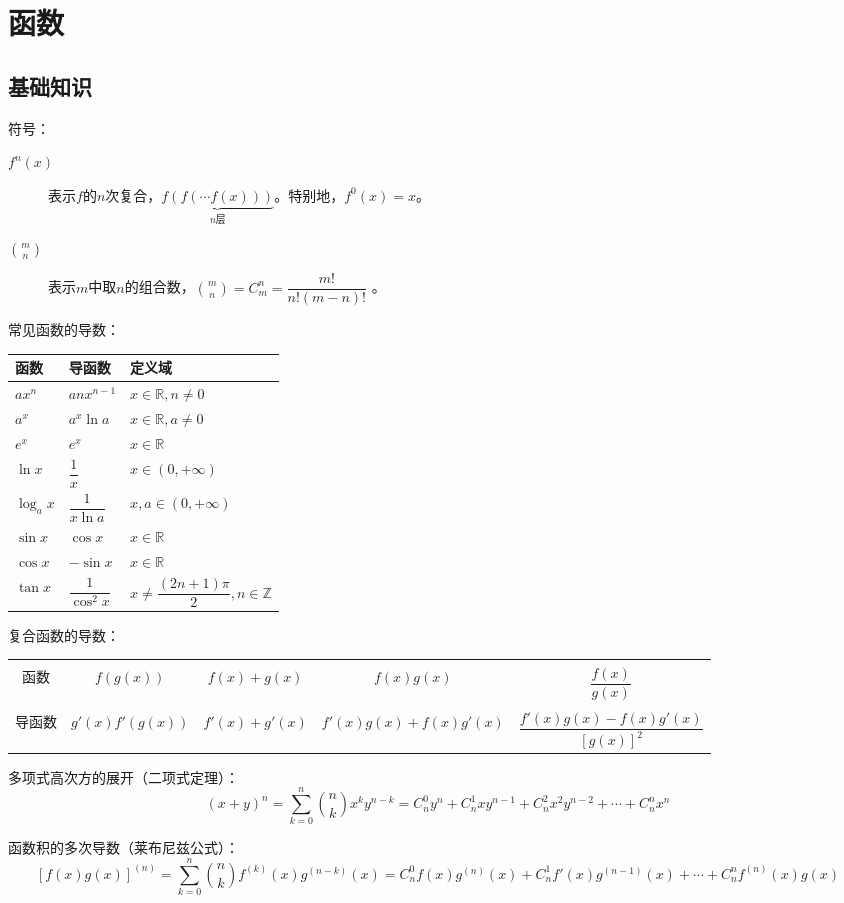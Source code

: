 \setchapterpreamble[u]{\margintoc}
\chapter{函数}
\section{基础知识}
符号：
\begin{description}
	\item[$f^n(x)$] 表示$f$的$n$次复合，$\underbrace{f(f(\cdots f(x)))}_{n\text{层}}$。特别地，$f^0(x)=x$。 
	\item[$\displaystyle\binom{m}{n}$] 表示$m$中取$n$的组合数，$\displaystyle\binom{m}{n}=C_m^n=\dfrac{m!}{n!(m-n)!}$ 。
\end{description}
常见函数的导数：\\
\begin{center}
	\begin{tabular}{lll}
		\hline
		函数&导函数&定义域\\
		\hline
		$ax^n$&$anx^{n-1}$&$x\in\mathbb{R},n\neq 0$\\
		$a^x$&$a^x\ln a$&$x \in \mathbb{R},a\neq 0$\\
		$e^x$&$e^x$&$x \in \mathbb{R}$\\
		$\ln x$&$\dfrac{1}{x}$&$x \in (0,+\infty)$\\
		$\log_a{x}$&$\dfrac{1}{x\ln a}$&$x,a \in (0,+\infty)$\\
		$\sin x$&$\cos x$&$x\in \mathbb{R}$\\
		$\cos x$&$-\sin x$&$x\in \mathbb{R}$\\
		$\tan x$&$\dfrac{1}{\cos^2 x}$&$x \neq \dfrac{(2n+1)\pi}{2}, n \in \mathbb{Z}$\\[0.5em]
		\hline
	\end{tabular} 
\end{center}
复合函数的导数：\par\vspace{1em}
\begin{tabular}{ccccc}
	\hline\\[-1em]
	函数&$f(g(x))$&$f(x)+g(x)$&$f(x)g(x)$&$\dfrac{f(x)}{g(x)}$\\[1em]
	\hline\\[-1em]
	导函数&$g'(x)f'(g(x))$&$f'(x)+g'(x)$&$f'(x)g(x)+f(x)g'(x)$&$\dfrac{f'(x)g(x)-f(x)g'(x)}{[g(x)]^2}$\\[1em]
	\hline
\end{tabular}\par\vspace{1em}
多项式高次方的展开（二项式定理）：
$$(x+y)^n=\sum_{k=0}^n\binom{n}{k}x^ky^{n-k}=C_n^0y^n+C_n^{1}xy^{n-1}+C_n^2x^2y^{n-2}+\cdots+C_n^nx^n$$
\par
函数积的多次导数（莱布尼兹公式）：
$$\left[f(x)g(x)\right]^{(n)}=\sum_{k=0}^n \binom{n}{k} f^{(k)}(x)g^{(n-k)}(x)=C_n^0f(x)g^{(n)}(x)+C_n^1f'(x)g^{(n-1)}(x)+\cdots+C_n^nf^{(n)}(x)g(x)$$
